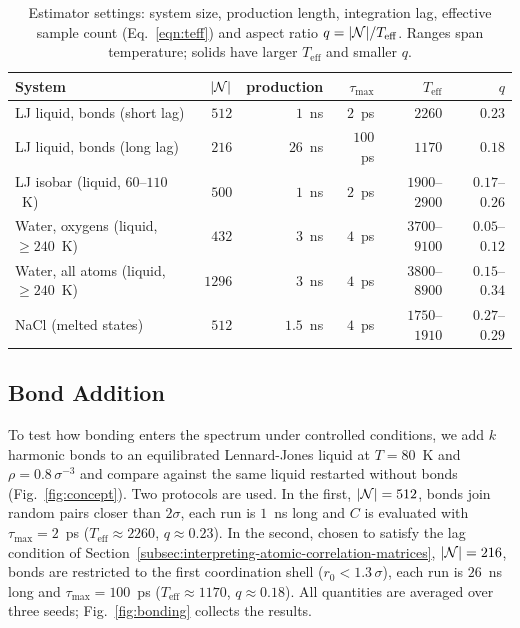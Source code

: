 \begin{table}[tbp]
    \centering
    \small
    \begin{tabular}{@{}lrrrrr@{}}
        \toprule
        System & $|\mathcal{N}|$ & production & $\tau_{\max}$ & $T_{\text{eff}}$ & $q$ \\ \midrule
        LJ liquid, bonds (short lag) & $512$ & $1$~ns & $2$~ps & $2260$ & $0.23$ \\
        LJ liquid, bonds (long lag) & $216$ & $26$~ns & $100$~ps & $1170$ & $0.18$ \\
        LJ isobar (liquid, $60$--$110$~K) & $500$ & $1$~ns & $2$~ps & $1900$--$2900$ & $0.17$--$0.26$ \\
        Water, oxygens (liquid, $\geq 240$~K) & $432$ & $3$~ns & $4$~ps & $3700$--$9100$ & $0.05$--$0.12$ \\
        Water, all atoms (liquid, $\geq 240$~K) & $1296$ & $3$~ns & $4$~ps & $3800$--$8900$ & $0.15$--$0.34$ \\
        NaCl (melted states) & $512$ & $1.5$~ns & $4$~ps & $1750$--$1910$ & $0.27$--$0.29$ \\ \bottomrule
    \end{tabular}
    \caption{Estimator settings: system size, production length, integration lag, effective sample count (Eq.~\eqref{eqn:teff}) and aspect ratio $q = |\mathcal{N}|/T_{\text{eff}}$. Ranges span temperature; solids have larger $T_{\text{eff}}$ and smaller $q$.}
    \label{tab:parameters}
\end{table}

\subsection{Bond Addition}
\label{subsec:bond-addition}
To test how bonding enters the spectrum under controlled conditions, we add $k$ harmonic bonds to an equilibrated Lennard-Jones liquid at $T = 80$~K and $\rho = 0.8\,\sigma^{-3}$ and compare against the same liquid restarted without bonds (Fig.~\ref{fig:concept}).
Two protocols are used.
In the first, $|\mathcal{N}| = 512$, bonds join random pairs closer than $2\sigma$, each run is $1$~ns long and $C$ is evaluated with $\tau_{\max} = 2$~ps ($T_{\text{eff}} \approx 2260$, $q \approx 0.23$).
In the second, chosen to satisfy the lag condition of Section~\ref{subsec:interpreting-atomic-correlation-matrices}, $|\mathcal{N}| = 216$, bonds are restricted to the first coordination shell ($r_{0} < 1.3\,\sigma$), each run is $26$~ns long and $\tau_{\max} = 100$~ps ($T_{\text{eff}} \approx 1170$, $q \approx 0.18$).
All quantities are averaged over three seeds; Fig.~\ref{fig:bonding} collects the results.

